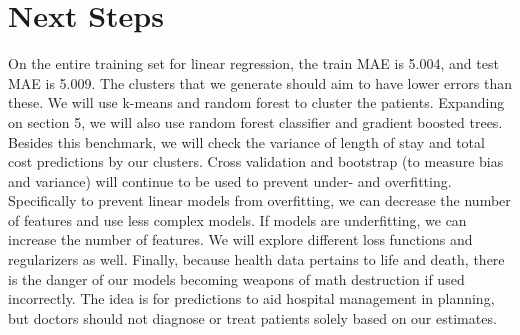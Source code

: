 \documentclass{article}
\begin{document}
\section{Next Steps}
On the entire training set for linear regression, the train MAE is 5.004, and test MAE is 5.009. The clusters that we generate should aim to have lower errors than these. We will use k-means and random forest to cluster the patients. Expanding on section 5, we will also use random forest classifier and gradient boosted trees. Besides this benchmark, we will check the variance of length of stay and total cost predictions by our clusters. Cross validation and bootstrap (to measure bias and variance) will continue to be used to prevent under- and overfitting. Specifically to prevent linear models from overfitting, we can decrease the number of features and use less complex models. If models are underfitting, we can increase the number of features. We will explore different loss functions and regularizers as well. 
\newline
Finally, because health data pertains to life and death, there is the danger of our models becoming weapons of math destruction if used incorrectly. The idea is for predictions to aid hospital management in planning, but doctors should not diagnose or treat patients solely based on our estimates.
\end{document}
